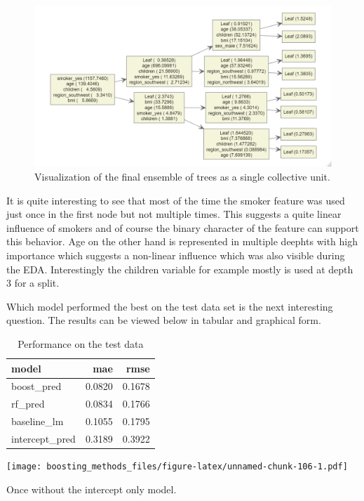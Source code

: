 \documentclass[
]{book}
\begin{document}
\begin{figure}

{\centering \includegraphics[width=0.7\linewidth]{_pictures/ins_multitree_xgb} 

}

\caption{Visualization of the final ensemble of trees as a single collective unit.}\label{fig:insmultitree}
\end{figure}

It is quite interesting to see that most of the time the smoker feature was used just once in the first node but not multiple times. This suggests a quite linear influence of smokers and of course the binary character of the feature can support this behavior. Age on the other hand is represented in multiple deephts with high importance which suggests a non-linear influence which was also visible during the EDA. Interestingly the children variable for example mostly is used at depth 3 for a split.

Which model performed the best on the test data set is the next interesting question. The results can be viewed below in tabular and graphical form.

\begin{table}

\caption{\label{tab:perfIns}Performance on the test data}
\centering
\begin{tabular}[t]{lrr}
\toprule
model & mae & rmse\\
\midrule
boost\_pred & 0.0820 & 0.1678\\
rf\_pred & 0.0834 & 0.1766\\
baseline\_lm & 0.1055 & 0.1795\\
intercept\_pred & 0.3189 & 0.3922\\
\bottomrule
\end{tabular}
\end{table}

\texttt{[image: boosting\_methods\_files/figure-latex/unnamed-chunk-106-1.pdf]}

Once without the intercept only model.
\end{document}
